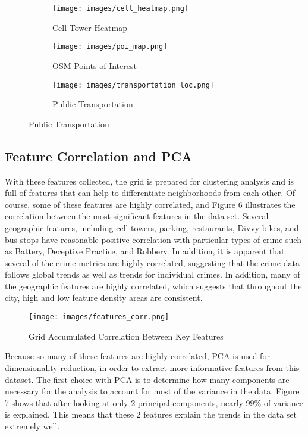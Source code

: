 \documentclass[times new roman,12pt]{article}
\begin{document}
\begin{figure}[H]
\centering
\caption{Chicago Point of Interest Datasets}
\begin{subfigure}[t]{.3\textwidth}
\centering
  \texttt{[image: images/cell\_heatmap.png]}
  \caption{Cell Tower Heatmap}
  \label{fig:cell_towers}
\end{subfigure}%
\begin{subfigure}[t]{.35\textwidth}
\centering
  \texttt{[image: images/poi\_map.png]}
  \caption{OSM Points of Interest}
  \label{fig:osm_poi}
\end{subfigure}%
\begin{subfigure}[t]{.272\textwidth}
\centering
  \texttt{[image: images/transportation\_loc.png]}
  \caption{Public Transportation}
  \label{fig:public_trans}
\end{subfigure}
\label{fig:boundaries}
\end{figure}

\subsection{Feature Correlation and PCA}

With these features collected, the grid is prepared for clustering analysis and is full of features that can help to differentiate neighborhoods from each other. Of course, some of these features are highly correlated, and Figure 6 illustrates the correlation between the most significant features in the data set. Several geographic features, including cell towers, parking, restaurants, Divvy bikes, and bus stops have reasonable positive correlation with particular types of crime such as Battery, Deceptive Practice, and Robbery. In addition, it is apparent that several of the crime metrics are highly correlated, suggesting that the crime data follows global trends as well as trends for individual crimes. In addition, many of the geographic features are highly correlated, which suggests that throughout the city, high and low feature density areas are consistent.

\begin{figure}[H]
\label{correlation}
\centering
\caption{Grid Accumulated Correlation Between Key Features}
  \texttt{[image: images/features\_corr.png]}
  \label{fig:features_corr}
\end{figure}

Because so many of these features are highly correlated, PCA is used for dimensionality reduction, in order to extract more informative features from this dataset. The first choice with PCA is to determine how many components are necessary for the analysis to account for most of the variance in the data. Figure 7 shows that after looking at only 2 principal components, nearly 99\% of variance is explained. This means that these 2 features explain the trends in the data set extremely well. 
\end{document}
